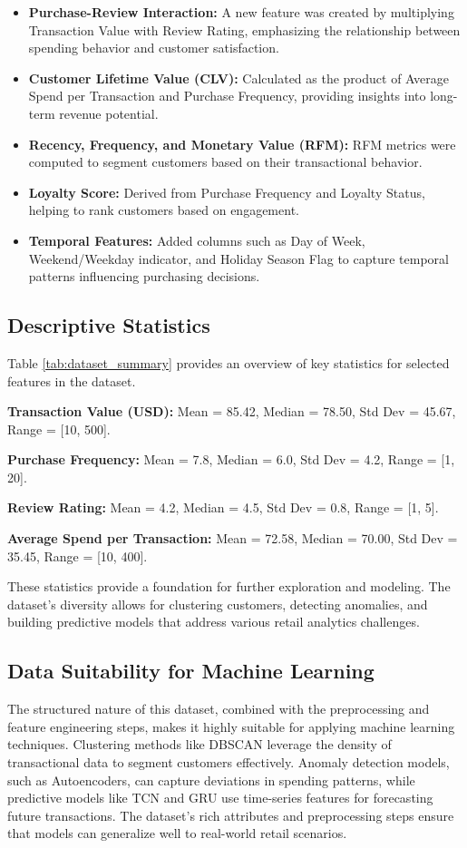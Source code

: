 \documentclass[12pt, a4paper,twoside]{report}
\theoremstyle{plain} %
\theoremstyle{definition} %
\theoremstyle{remark} %
\numberwithin{equation}{chapter}
\begin{document}
\begin{itemize}
\item \textbf{Purchase-Review Interaction:} A new feature was created by multiplying Transaction Value with Review Rating, emphasizing the relationship between spending behavior and customer satisfaction.
\item \textbf{Customer Lifetime Value (CLV):} Calculated as the product of Average Spend per Transaction and Purchase Frequency, providing insights into long-term revenue potential.
\item \textbf{Recency, Frequency, and Monetary Value (RFM):} RFM metrics were computed to segment customers based on their transactional behavior.
\item \textbf{Loyalty Score:} Derived from Purchase Frequency and Loyalty Status, helping to rank customers based on engagement.
\item \textbf{Temporal Features:} Added columns such as Day of Week, Weekend/Weekday indicator, and Holiday Season Flag to capture temporal patterns influencing purchasing decisions.
\end{itemize}

\subsection{Descriptive Statistics}
Table \ref{tab:dataset_summary} provides an overview of key statistics for selected features in the dataset.

\textbf{Transaction Value (USD):} Mean = 85.42, Median = 78.50, Std Dev = 45.67, Range = [10, 500].

\textbf{Purchase Frequency:} Mean = 7.8, Median = 6.0, Std Dev = 4.2, Range = [1, 20].

\textbf{Review Rating:} Mean = 4.2, Median = 4.5, Std Dev = 0.8, Range = [1, 5].

\textbf{Average Spend per Transaction:} Mean = 72.58, Median = 70.00, Std Dev = 35.45, Range = [10, 400].

These statistics provide a foundation for further exploration and modeling. The dataset's diversity allows for clustering customers, detecting anomalies, and building predictive models that address various retail analytics challenges.

\subsection{Data Suitability for Machine Learning}
The structured nature of this dataset, combined with the preprocessing and feature engineering steps, makes it highly suitable for applying machine learning techniques. Clustering methods like DBSCAN leverage the density of transactional data to segment customers effectively. Anomaly detection models, such as Autoencoders, can capture deviations in spending patterns, while predictive models like TCN and GRU use time-series features for forecasting future transactions. The dataset's rich attributes and preprocessing steps ensure that models can generalize well to real-world retail scenarios.
\end{document}
